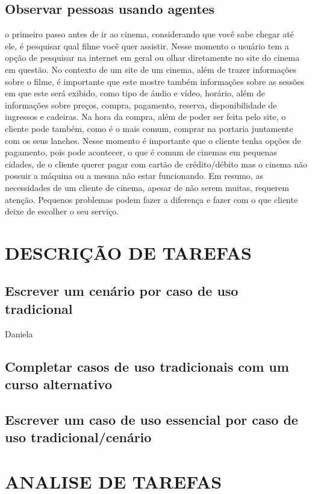 \documentclass[12pt]{article}
\begin{document}
     \subsection{Observar pessoas usando agentes}
        o primeiro passo antes de ir ao cinema, considerando que você sabe chegar até ele, é pesquisar qual filme você quer assistir. Nesse momento o usuário tem a opção de pesquisar na internet em geral ou olhar diretamente no site do cinema em questão. 
        No contexto de um site de um cinema, além de trazer informações sobre o filme, é importante que este mostre também informações sobre as sessões em que este será exibido, como tipo de áudio e vídeo, horário, além de informações sobre preços, compra,  pagamento, reserva, disponibilidade de ingressos e cadeiras.
        Na hora da compra, além de poder ser feita pelo site, o cliente pode também, como é o mais comum, comprar na portaria juntamente com os seus lanches. Nesse momento é importante que o cliente tenha opções de pagamento, pois pode acontecer, o que é comum de cinemas em pequenas cidades, de o cliente querer pagar com cartão de crédito/débito mas o cinema não possuir a máquina ou a mesma não estar funcionando.
        Em resumo, as necessidades de um cliente de cinema, apesar de não serem muitas, requerem atenção. Pequenos problemas podem fazer a diferença e fazer com o que cliente deixe de escolher o seu serviço.
     
    \section{DESCRIÇÃO DE TAREFAS}
        \subsection{Escrever um cenário por caso de uso tradicional}
            Daniela
        \subsection{Completar casos de uso tradicionais com um curso alternativo}
        
        \subsection{Escrever um caso de uso essencial por caso de uso tradicional/cenário}
        
    \section{ANALISE DE TAREFAS}
\end{document}
